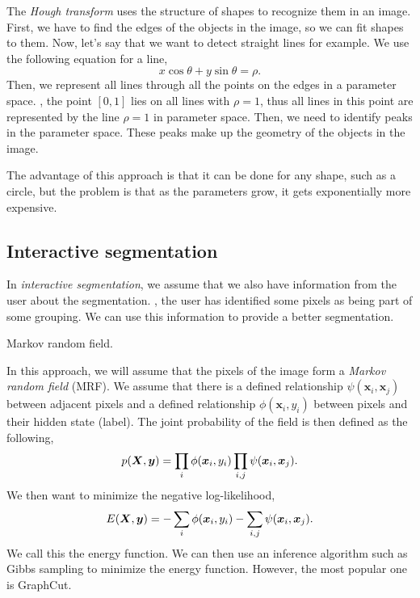 The \textit{Hough transform} uses the structure of shapes to recognize them in
an image. First, we have to find the edges of the objects in the image, so we
can fit shapes to them. Now, let's say that we want to detect straight lines
for example. We use the following equation for a line, \[
    x\cos\theta + y\sin\theta = \rho.
\]
Then, we represent all lines through all the points on the edges in a
parameter space. \Eg, the point $[0,1]$ lies on all lines with $\rho=1$, thus
all lines in this point are represented by the line $\rho=1$ in parameter
space. Then, we need to identify peaks in the parameter space. These peaks
make up the geometry of the objects in the image.

The advantage of this approach is that it can be done for any shape, such as
a circle, but the problem is that as the parameters grow, it gets
exponentially more expensive.

\subsection{Interactive segmentation}

In \textit{interactive segmentation}, we assume that we also have information
from the user about the segmentation. \Ie, the user has identified some pixels
as being part of some grouping. We can use this information to provide a better
segmentation.

\begin{marginfigure}
    \centering
    \caption{Markov random field.}
    \label{fig:mrf}
\end{marginfigure}

In this approach, we will assume that the pixels of the image form a
\textit{Markov random field} (MRF). We assume that there is a defined
relationship $\psi(\bm{x}_i,\bm{x}_j)$ between adjacent pixels and a defined
relationship $\phi(\bm{x}_i,y_i)$ between pixels and their hidden state
(label). The joint probability of the field is then defined as the following,
\[
    p(\bm{X},\bm{y}) = \prod_i \phi(\bm{x}_i,y_i) \prod_{i,j} \psi(\bm{x}_i,\bm{x}_j).
\]
We then want to minimize the negative log-likelihood, \[
    E(\bm{X},\bm{y}) = -\sum_i \phi(\bm{x}_i,y_i) -\sum_{i,j} \psi(\bm{x}_i,\bm{x}_j).
\]
We call this the energy function. We can then use an inference algorithm such
as Gibbs sampling to minimize the energy function. However, the most popular
one is GraphCut.

